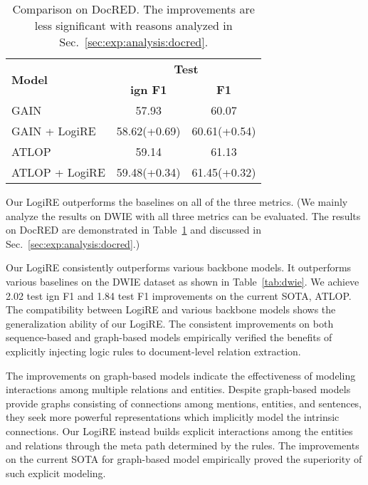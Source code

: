 \documentclass[11pt]{article}
\newcommand{\mymodel}{LogiRE\xspace}
\begin{document}
\begin{table}[t]
    \small
    \centering
    \begin{tabular}{lcc}
    \toprule
        \multirow{2}{*}{\bf Model} & \multicolumn{2}{c}{\bf Test} \\ \cmidrule(lr){2-3}
        ~ & \bf ign F1 & \bf F1 \\ \midrule
        GAIN & 57.93 & 60.07 \\ 
         GAIN + \mymodel & 58.62(+0.69) & 60.61(+0.54) \\ \midrule 
        ATLOP & 59.14 & 61.13 \\ 
        ATLOP + \mymodel & 59.48(+0.34) & 61.45(+0.32) \\ \bottomrule
    \end{tabular}
    \caption{Comparison on DocRED. The improvements are less significant with reasons analyzed in Sec.~\ref{sec:exp:analysis:docred}.}
    \label{tab:docred}
\end{table}

Our \mymodel outperforms the baselines on all of the three metrics. (We mainly analyze the results on DWIE with all three metrics can be evaluated. The results on DocRED are demonstrated in Table~\ref{tab:docred} and discussed in Sec.~\ref{sec:exp:analysis:docred}.)

Our \mymodel consistently outperforms various backbone models. 
It outperforms various baselines on the DWIE dataset as shown in Table~\ref{tab:dwie}. We achieve 2.02 test ign F1 and 1.84 test F1 improvements on the current SOTA, ATLOP. The compatibility between \mymodel and various backbone models shows the generalization ability of our \mymodel. 
The consistent improvements on both sequence-based and graph-based models empirically verified the benefits of explicitly injecting logic rules to document-level relation extraction.

The improvements on graph-based models indicate the effectiveness of modeling interactions among multiple relations and entities. Despite graph-based models provide graphs \cite{christopoulou-etal-2019-connecting, wang-etal-2020-global} consisting of connections among mentions, entities, and sentences, they seek more powerful representations which implicitly model the intrinsic connections. Our \mymodel instead builds explicit interactions among the entities and relations through the meta path determined by the rules. The improvements on the current SOTA for graph-based model empirically proved the superiority of such explicit modeling.
\end{document}
